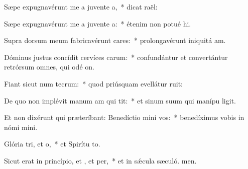 \item Sæpe expugnavérunt me a juvente a,~* dicat  raël:
\item Sæpe expugnavérunt me a juvente a:~* étenim non potué hi.
\item Supra dorsum meum fabricavérunt cares:~* prolongavérunt iniquitá am.
\item Dóminus justus concídit cervíces carum:~* confundántur et convertántur retrórsum omnes, qui odé on.
\item Fiant sicut num tecrum:~* quod priúsquam evellátur ruit:
\item De quo non implévit manum am qui tit:~* et sinum suum qui manípu ligit.
\item Et non dixérunt qui præteríbant: Benedíctio mini  vos:~* benedíximus vobis in nómi mini.
\item Glória tri, et o,~* et Spirítu to.
\item Sicut erat in princípio, et , et per,~* et in sǽcula sæculó. men.
